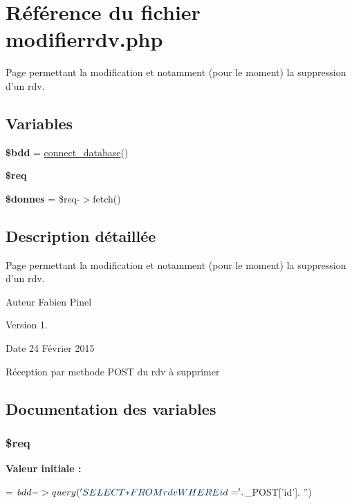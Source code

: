\hypertarget{modifierrdv_8php}{\section{Référence du fichier modifierrdv.\-php}
\label{modifierrdv_8php}
}


Page permettant la modification et notamment (pour le moment) la suppression d'un rdv.  


\subsection*{Variables}
\begin{DoxyCompactItemize}
\item 
\hypertarget{modifierrdv_8php_a94f91e878bce0991e2cd595c5dd79b3f}{{\bfseries \$bdd} = \hyperlink{function_8php_a1f56f7efe8c1222675d8715c259957d5}{connect\-\_\-database}()}\label{modifierrdv_8php_a94f91e878bce0991e2cd595c5dd79b3f}

\item 
{\bfseries \$req}
\item 
\hypertarget{modifierrdv_8php_a93720f3d7a3eb4aabe4bb2053895b6b6}{{\bfseries \$donnes} = \$req-\/$>$fetch()}\label{modifierrdv_8php_a93720f3d7a3eb4aabe4bb2053895b6b6}

\end{DoxyCompactItemize}


\subsection{Description détaillée}
Page permettant la modification et notamment (pour le moment) la suppression d'un rdv. \begin{DoxyAuthor}{Auteur}
Fabien Pinel 
\end{DoxyAuthor}
\begin{DoxyVersion}{Version}
1. 
\end{DoxyVersion}
\begin{DoxyDate}{Date}
24 Février 2015
\end{DoxyDate}
Réception par methode P\-O\-S\-T du rdv à supprimer 

\subsection{Documentation des variables}
\hypertarget{modifierrdv_8php_a63a7a283ea5dee8af1e2d5a3435bf370}{
\subsubsection[{\$req}]{\setlength{\rightskip}{0pt plus 5cm}\$req}}\label{modifierrdv_8php_a63a7a283ea5dee8af1e2d5a3435bf370}
{\bfseries Valeur initiale \-:}
\begin{DoxyCode}
= $bdd->query(\textcolor{stringliteral}{' SELECT *  }
\textcolor{stringliteral}{            FROM rdv}
\textcolor{stringliteral}{            WHERE id = '} .$\_POST[\textcolor{stringliteral}{'id'}]. \textcolor{stringliteral}{''})
\end{DoxyCode}
